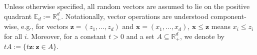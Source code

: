 \documentclass[aos]{imsart}
\numberwithin{equation}{section}
\theoremstyle{plain} %
\theoremstyle{remark}
\newcommand{\E}{\mathbb{E}}
\newcommand{\R}{\mathbb{R}}
\def\bx{\boldsymbol x}
\def\bz{\boldsymbol z}
\newcommand{\DAS}[1]{{\color{red} #1}}
\begin{document}
Unless otherwise specified,  all random vectors are assumed to lie on the positive quadrant $\E_d:=\R_{+}^{d}$. Notationally, vector operations are  understood component-wise, e.g., for vectors $\bz=(z_1,\ldots,z_d)$ and $\bx=(x_1,\ldots,x_d)$, $\bx\le \bz$ means $x_i\le z_i$ for all $i$.  Moreover, for a constant $t>0$ and a set $A\subseteq \R_+^{d}$, we denote by {$tA:= \{t\bz: \bz\in A\}$.}

\end{document}
